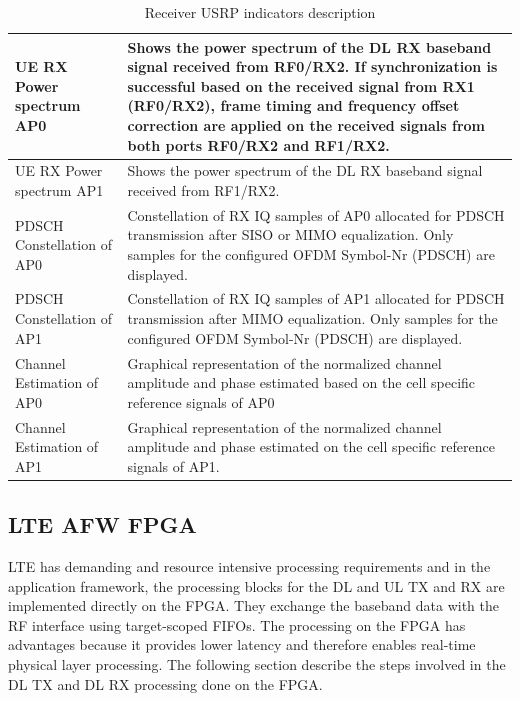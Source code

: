 \begin{landscape}
\begin{table}[]
\begin{tabular}{|l|p{14cm}|}
            UE RX Power spectrum AP0   & Shows the power spectrum of the DL RX baseband signal received from RF0/RX2.  If synchronization is successful based on the received signal from RX1 (RF0/RX2), frame timing and frequency offset correction are applied on the received signals from both ports RF0/RX2 and RF1/RX2. \\ \hline
            UE RX Power spectrum AP1   & Shows the power spectrum of the DL RX baseband signal received from RF1/RX2.                                                                                                                                                                                                          \\ \hline
            PDSCH Constellation of AP0 & Constellation of RX IQ samples of AP0 allocated for PDSCH transmission after SISO or MIMO equalization. Only samples for the configured OFDM Symbol-Nr (PDSCH) are displayed.                                                                                                         \\ \hline
            PDSCH Constellation of AP1 & Constellation of RX IQ samples of AP1 allocated for PDSCH transmission after MIMO equalization. Only samples for the configured OFDM Symbol-Nr (PDSCH) are displayed.                                                                                                                 \\ \hline
            Channel Estimation of AP0  & Graphical representation of the normalized channel amplitude and phase estimated based on the cell specific reference signals of AP0                                                                                                                                                  \\ \hline
            Channel Estimation of AP1  & Graphical representation of the normalized channel amplitude and phase estimated on the cell specific reference signals of AP1.                                                                                                                                                       \\ \hline
        \end{tabular}
        \caption{Receiver USRP indicators description}
        \label{tab:RXUSRPParamDesc}
    \end{table}
\end{landscape}

\subsection{LTE AFW FPGA}\label{ssec:LTEAFWFPGA}
LTE has demanding and resource intensive processing requirements and in the application framework, the processing blocks for the DL and UL TX and RX are implemented directly on the FPGA. They exchange the baseband data with the RF interface using target-scoped FIFOs. The processing on the FPGA has advantages because it provides lower latency and therefore enables real-time physical layer processing. The following section describe the steps involved in the DL TX and DL RX processing done on the FPGA.

